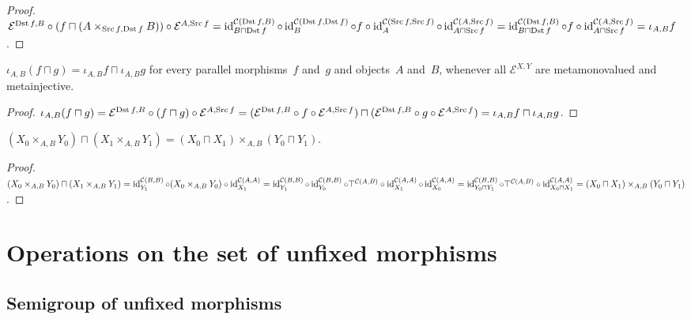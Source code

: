 \begin{proof}
$\mathcal{E}^{\operatorname{Dst} f,B}\circ
(f\sqcap(A\times_{\operatorname{Src} f,\operatorname{Dst} f}B))\circ
\mathcal{E}^{A,\operatorname{Src} f}=
\operatorname{id}^{\mathcal{C}(\operatorname{Dst} f,B)}_{B\sqcap\operatorname{Dst} f}\circ
\operatorname{id}^{\mathcal{C}(\operatorname{Dst} f,\operatorname{Dst} f)}_B\circ f\circ
\operatorname{id}^{\mathcal{C}(\operatorname{Src} f,\operatorname{Src} f)}_A\circ
\operatorname{id}^{\mathcal{C}(A,\operatorname{Src} f)}_{A\sqcap\operatorname{Src} f}=
\operatorname{id}^{\mathcal{C}(\operatorname{Dst} f,B)}_{B\sqcap\operatorname{Dst} f}\circ
f\circ
\operatorname{id}^{\mathcal{C}(A,\operatorname{Src} f)}_{A\sqcap\operatorname{Src} f}=
\iota_{A,B}f$.
\end{proof}

\begin{prop}
$\iota_{A,B}(f\sqcap g)=\iota_{A,B}f\sqcap\iota_{A,B}g$
for every parallel morphisms~$f$ and~$g$ and objects~$A$
and~$B$, whenever all $\mathcal{E}^{X,Y}$ are metamonovalued
and metainjective.
\end{prop}

\begin{proof}
$\iota_{A,B}(f\sqcap g)=
\mathcal{E}^{\operatorname{Dst} f,B}\circ(f\sqcap g)\circ
\mathcal{E}^{A,\operatorname{Src} f}=
(\mathcal{E}^{\operatorname{Dst} f,B}\circ f\circ\mathcal{E}^{A,\operatorname{Src} f})\sqcap
(\mathcal{E}^{\operatorname{Dst} f,B}\circ g\circ\mathcal{E}^{A,\operatorname{Src} f})=
\iota_{A,B}f\sqcap\iota_{A,B}g$.
\end{proof}

\begin{prop}
$(X_0\times_{A,B}Y_0)\sqcap(X_1\times_{A,B}Y_1)=
(X_0\sqcap X_1)\times_{A,B}(Y_0\sqcap Y_1)$.
\end{prop}

\begin{proof}
$(X_0\times_{A,B}Y_0)\sqcap(X_1\times_{A,B}Y_1)=
\operatorname{id}^{\mathcal{C}(B,B)}_{Y_1}\circ(X_0\times_{A,B}Y_0)\circ
\operatorname{id}^{\mathcal{C}(A,A)}_{X_1}=
\operatorname{id}^{\mathcal{C}(B,B)}_{Y_1}\circ
\operatorname{id}^{\mathcal{C}(B,B)}_{Y_0}\circ
\top^{\mathcal{C}(A,B)}\circ
\operatorname{id}^{\mathcal{C}(A,A)}_{X_1}\circ
\operatorname{id}^{\mathcal{C}(A,A)}_{X_0}=
\operatorname{id}^{\mathcal{C}(B,B)}_{Y_0\sqcap Y_1}\circ
\top^{\mathcal{C}(A,B)}\circ
\operatorname{id}^{\mathcal{C}(A,A)}_{X_0\sqcap X_1}=
(X_0\sqcap X_1)\times_{A,B}(Y_0\sqcap Y_1)$.
\end{proof}

\section{Operations on the set of unfixed morphisms}

\subsection{Semigroup of unfixed morphisms}

